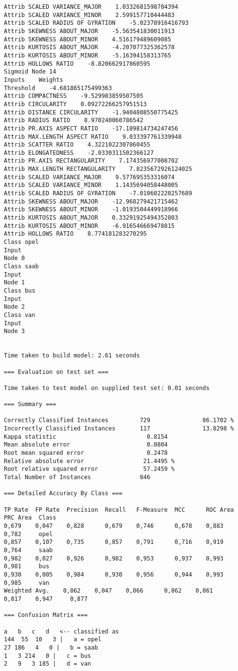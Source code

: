 \documentclass[
	article,			%
	11pt,				%
	oneside,			%
	a4paper,			%
	english,			%
	brazil,				%
	sumario=tradicional
	]{abntex2}
\begin{document}
\begin{lstlisting}
Attrib SCALED VARIANCE_MAJOR    1.0332681598704394
Attrib SCALED VARIANCE_MINOR    2.599157710444483
Attrib SCALED RADIUS OF GYRATION    -5.02378916416793
Attrib SKEWNESS ABOUT_MAJOR    -5.563541830011913
Attrib SKEWNESS ABOUT_MINOR    4.516179489609085
Attrib KURTOSIS ABOUT_MAJOR    -4.207077325362578
Attrib KURTOSIS ABOUT_MINOR    -5.16394158313765
Attrib HOLLOWS RATIO    -8.820662917860595
Sigmoid Node 14
Inputs    Weights
Threshold    -4.681865175499363
Attrib COMPACTNESS    -9.529983859507505
Attrib CIRCULARITY    0.09272266257951513
Attrib DISTANCE CIRCULARITY    -1.9404808550775425
Attrib RADIUS RATIO    8.970240060786542
Attrib PR.AXIS ASPECT RATIO    -17.189814734247456
Attrib MAX.LENGTH ASPECT RATIO    9.033397761339948
Attrib SCATTER RATIO    4.3221022307860455
Attrib ELONGATEDNESS    -2.0330311502366127
Attrib PR.AXIS RECTANGULARITY    7.174356977008702
Attrib MAX.LENGTH RECTANGULARITY    7.8235672926124025
Attrib SCALED VARIANCE_MAJOR    9.577695353316074
Attrib SCALED VARIANCE_MINOR    1.1435694058448005
Attrib SCALED RADIUS OF GYRATION    -7.010602220257689
Attrib SKEWNESS ABOUT_MAJOR    -12.968279421715462
Attrib SKEWNESS ABOUT_MINOR    -1.0193504449918966
Attrib KURTOSIS ABOUT_MAJOR    0.33291925494352803
Attrib KURTOSIS ABOUT_MINOR    -6.916546669478815
Attrib HOLLOWS RATIO    8.774181283270295
Class opel
Input
Node 0
Class saab
Input
Node 1
Class bus
Input
Node 2
Class van
Input
Node 3


Time taken to build model: 2.61 seconds

=== Evaluation on test set ===

Time taken to test model on supplied test set: 0.01 seconds

=== Summary ===

Correctly Classified Instances         729               86.1702 %
Incorrectly Classified Instances       117               13.8298 %
Kappa statistic                          0.8154
Mean absolute error                      0.0804
Root mean squared error                  0.2478
Relative absolute error                 21.4495 %
Root relative squared error             57.2459 %
Total Number of Instances              846     

=== Detailed Accuracy By Class ===

TP Rate  FP Rate  Precision  Recall   F-Measure  MCC      ROC Area  PRC Area  Class
0,679    0,047    0,828      0,679    0,746      0,678    0,883     0,782     opel
0,857    0,107    0,735      0,857    0,791      0,716    0,919     0,764     saab
0,982    0,027    0,926      0,982    0,953      0,937    0,993     0,981     bus
0,930    0,005    0,984      0,930    0,956      0,944    0,993     0,985     van
Weighted Avg.    0,862    0,047    0,866      0,862    0,861      0,817    0,947     0,877     

=== Confusion Matrix ===

a   b   c   d   <-- classified as
144  55  10   3 |   a = opel
27 186   4   0 |   b = saab
1   3 214   0 |   c = bus
2   9   3 185 |   d = van


\end{lstlisting}
\end{document}
